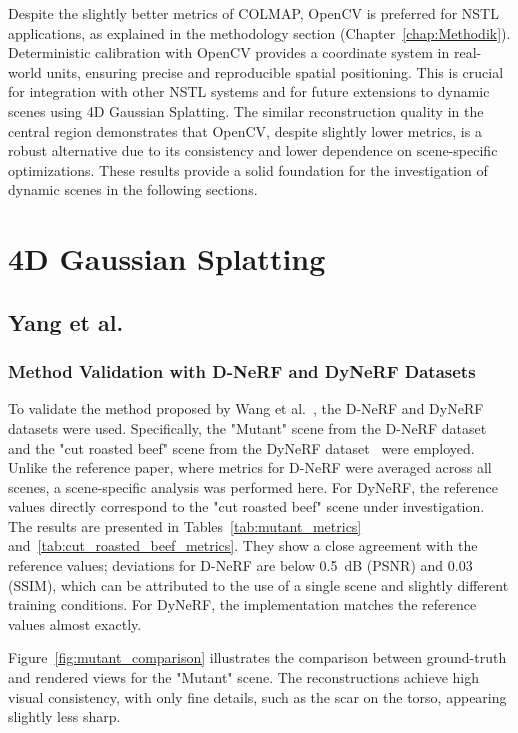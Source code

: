 Despite the slightly better metrics of COLMAP, OpenCV is preferred for NSTL applications, as explained in the methodology section (Chapter~\ref{chap:Methodik}). 
Deterministic calibration with OpenCV provides a coordinate system in real-world units, ensuring precise and reproducible spatial positioning. 
This is crucial for integration with other NSTL systems and for future extensions to dynamic scenes using 4D Gaussian Splatting. 
The similar reconstruction quality in the central region demonstrates that OpenCV, despite slightly lower metrics, is a robust alternative due to its consistency and lower dependence on scene-specific optimizations. 
These results provide a solid foundation for the investigation of dynamic scenes in the following sections.




\section{4D Gaussian Splatting}

\subsection{Yang et al.}

\subsubsection{Method Validation with D-NeRF and DyNeRF Datasets}
To validate the method proposed by Wang et al.~\cite{yang2023gs4d}, the D-NeRF and DyNeRF datasets were used. 
Specifically, the "Mutant" scene from the D-NeRF dataset~\cite{pumarola2021d} and the "cut roasted beef" scene from the DyNeRF dataset~\cite{li2022neural} were employed. 
Unlike the reference paper, where metrics for D-NeRF were averaged across all scenes, a scene-specific analysis was performed here. 
For DyNeRF, the reference values directly correspond to the "cut roasted beef" scene under investigation. 
The results are presented in Tables~\ref{tab:mutant_metrics} and~\ref{tab:cut_roasted_beef_metrics}. 
They show a close agreement with the reference values; deviations for D-NeRF are below 0.5~dB (PSNR) and 0.03 (SSIM), which can be attributed to the use of a single scene and slightly different training conditions. 
For DyNeRF, the implementation matches the reference values almost exactly. 

Figure~\ref{fig:mutant_comparison} illustrates the comparison between ground-truth and rendered views for the "Mutant" scene. 
The reconstructions achieve high visual consistency, with only fine details, such as the scar on the torso, appearing slightly less sharp. 

